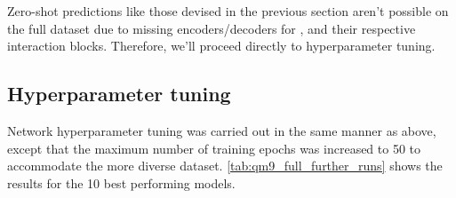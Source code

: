 Zero-shot predictions like those devised in the previous section aren't possible on the full dataset due to missing encoders/decoders for ,  and their respective interaction blocks. Therefore, we'll proceed directly to hyperparameter tuning. 
\subsection{Hyperparameter tuning}
\label{sec:qm9_full_isomers_hyp_tuning}
Network hyperparameter tuning was carried out in the same manner as above, except that the maximum number of training epochs was increased to 50 to accommodate the more diverse dataset. \autoref{tab:qm9_full_further_runs} shows the results for the 10 best performing models.
\begin{table}[H]
    \centering
    \caption[GNN on full QM9 dataset sample with full matrix loss]{GNN on full QM9 dataset sample using full matrix loss and a maximum of 50 epochs to train. Metrics on test set and corresponding hyperparameter settings for 10 best performing networks in terms of iterations.}
    \label{tab:qm9_full_further_runs} 
\end{table}
